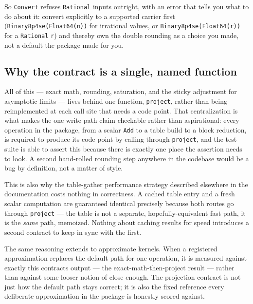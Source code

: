 So \texttt{Convert} refuses \texttt{Rational} inputs outright, with an error that tells you what to do about it: convert explicitly to a supported carrier first (\texttt{Binary8p4se(Float64(π))} for irrational values, or \texttt{Binary8p4se(Float64(r))} for a \texttt{Rational} \texttt{r}) and thereby own the double rounding as a choice you made, not a default the package made for you.



\subsection{Why the contract is a single, named function}



\label{5104813108012279296}{}


All of this — exact math, rounding, saturation, and the sticky adjustment for asymptotic limits — lives behind one function, \texttt{project}, rather than being reimplemented at each call site that needs a code point. That centralization is what makes the {\textquotedbl}one write path{\textquotedbl} claim checkable rather than aspirational: every operation in the package, from a scalar \texttt{Add} to a table build to a block reduction, is required to produce its code point by calling through \texttt{project}, and the test suite is able to assert this because there is exactly one place the assertion needs to look. A second hand-rolled rounding step anywhere in the codebase would be a bug by definition, not a matter of style.



This is also why the table-gather performance strategy described elsewhere in the documentation costs nothing in correctness. A cached table entry and a fresh scalar computation are guaranteed identical precisely because both routes go through \texttt{project} — the table is not a separate, hopefully-equivalent fast path, it is the \emph{same} path, memoized. Nothing about caching results for speed introduces a second contract to keep in sync with the first.



The same reasoning extends to approximate kernels. When a registered approximation replaces the default path for one operation, it is measured against exactly this contract{\textquotesingle}s output — the exact-math-then-project result — rather than against some looser notion of {\textquotedbl}close enough.{\textquotedbl} The projection contract is not just how the default path stays correct; it is also the fixed reference every deliberate approximation in the package is honestly scored against.



